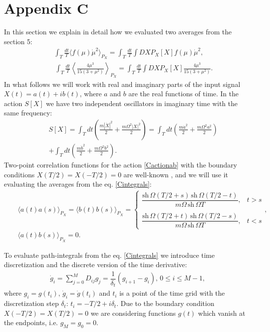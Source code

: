 \documentclass{article}
\begin{document}
\section{Appendix C}
In this section we explain in detail how we evaluated two averages from the section 5:
\begin{eqnarray}\label{Cintegrals}
    &&\int_{T} \frac{dt}{T}\langle f(\mu)\dot{\mu}^{2} \rangle_{P_{X}} = \int_{T} \frac{dt}{T} \int DX P_{X}[X] f(\mu)\dot{\mu}^{2},  \\ \nonumber
    &&\, \int_{T} \frac{dt}{T}\left\langle \frac{4 \mu^{3}}{15(3+\mu^{2})} \right\rangle_{P_{X}} = \int_{T} \frac{dt}{T} \int DX P_{X}[X] \frac{4 \mu^{3}}{15(3+\mu^{2})}.
\end{eqnarray}
In what follows we will work with real and imaginary parts of the input signal $X(t) = a(t)+i b(t)$, where $a$ and $b$ are the real functions of time. In the action $S[X]$ we have two independent oscillators in imaginary time with the same frequency: 
\begin{eqnarray}\label{Cactionab}
    &&S[X] = \int_{T} dt \left(\frac{m |\dot{X}|^{2}}{2}+\frac{m\Omega^{2}|X|^{2}}{2}\right) = \int_{T} dt \left(\frac{m \dot{a}^{2}}{2}+\frac{m\Omega^{2}a^{2}}{2}\right) \nonumber\\
    && + \int_{T} dt \left(\frac{m \dot{b}^{2}}{2}+\frac{m\Omega^{2}b^{2}}{2}\right).
\end{eqnarray}
Two-point correlation functions for the action \eqref{Cactionab} with the boundary conditions $X(T/2) = X(-T/2) = 0$ are well-known \cite{kleinert2009path}, and we will use it evaluating the averages from the eq$.$ \eqref{Cintegrals}: 
\begin{eqnarray}\label{correlatorscont}
    &&\langle a(t)a(s) \rangle_{P_{X}} = \langle b(t)b(s) \rangle_{P_{X}} =
    \begin{cases}
        \dfrac{\textrm{sh}\, \Omega (T/2+s)\, \textrm{sh}\, \Omega(T/2-t)}{m \Omega\, \textrm{sh}\, \Omega T}, & t>s\nonumber\\
        \\
        \dfrac{\textrm{sh}\, \Omega (T/2+t)\, \textrm{sh}\, \Omega(T/2-s)}{m \Omega\, \textrm{sh}\, \Omega T}, & t<s
    \end{cases},\\
    &&\langle a(t)b(s)\rangle_{P_{X}} = 0.
\end{eqnarray}

To evaluate path-integrals from the eq$.$ \eqref{Cintegrals} we introduce time discretization and the discrete version of the time derivative:
\begin{eqnarray}
    \dot{g}_{i}=\sum_{j=0}^{M}D_{ij}g_{j} = \dfrac{1}{\delta_{t}}\left(g_{i+1}-g_{i}\right), \, 0 \leq i \leq M-1,
\end{eqnarray}
where $g_{i} = g(t_{i}), \, \dot{g}_{i} = \dot{g}(t_{i})$  and $t_{i}$ is a point of the time grid with the discretization step $\delta_{t}$: $t_{i} = -T/2 + i\delta_{t}$. Due to the boundary condition $X(-T/2) = X(T/2) = 0$ we are considering functions $g(t)$ which vanish at the endpoints, i.e. $g_{M} = g_{0} = 0$.
\end{document}
